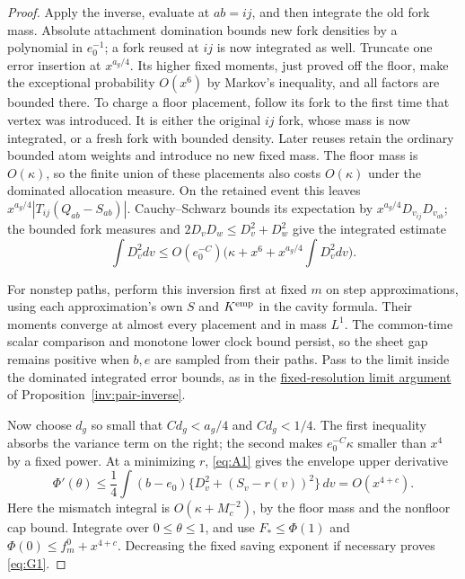 \begin{proof}
Apply the inverse, evaluate at \(ab=ij\), and then integrate the
old fork mass. Absolute attachment domination bounds new fork
densities by a polynomial in \(e_0^{-1}\); a fork reused at \(ij\)
is now integrated as well. Truncate one error insertion at
\(x^{a_g/4}\). Its higher fixed moments, just proved off the floor,
make the exceptional probability \(O(x^6)\) by Markov's inequality,
and all factors are bounded there. To charge a floor placement,
follow its fork to the first time that vertex was introduced. It is
either the original \(ij\) fork, whose mass is now integrated, or a
fresh fork with bounded density. Later reuses retain the ordinary
bounded atom weights and introduce no new fixed mass. The floor mass
is \(O(\kappa)\), so the finite union of these placements also costs
\(O(\kappa)\) under the dominated allocation measure.
On the retained event this leaves \(x^{a_g/4}|T_{ij}(Q_{ab}-S_{ab})|\).
Cauchy--Schwarz bounds its expectation by
\(x^{a_g/4}D_{v_{ij}}D_{v_{ab}}\); the bounded fork measures and
\(2D_vD_w\le D_v^2+D_w^2\) give the integrated estimate
\[
 \int D_v^2dv\le O(e_0^{-C})\big(\kappa+x^6+x^{a_g/4}\int D_v^2dv\big).
\]

For nonstep paths, perform this inversion first at fixed \(m\) on
step approximations, using each approximation's own \(S\) and
\(K^{\rm emp}\) in the cavity formula. Their moments converge at
almost every placement and in mass \(L^1\). The common-time scalar
comparison and monotone lower clock bound persist, so the sheet gap
remains positive when \(b,e\) are sampled from their paths.
Pass to the limit inside the dominated integrated error bounds, as
in the \hyperref[par:inverse-limits]{fixed-resolution limit argument}
of Proposition~\ref{inv:pair-inverse}.

Now choose \(d_g\) so small that \(Cd_g<a_g/4\) and
\(Cd_g<1/4\). The first inequality absorbs the variance term on
the right; the second makes \(e_0^{-C}\kappa\) smaller than
\(x^4\) by a fixed power. At a minimizing \(r\), \eqref{eq:A1}
gives the envelope upper derivative
\[
 \Phi'(\theta)\le\frac14\int(b-e_0)
                  \{D_v^2+(S_v-r(v))^2\}\,dv
                  =O(x^{4+c}).
\]
Here the mismatch integral is \(O(\kappa+M_c^{-2})\), by the
floor mass and the nonfloor cap bound. Integrate over
\(0\le\theta\le1\), and use
\(F_*\le\Phi(1)\) and \(\Phi(0)\le f_m^0+x^{4+c}\).
Decreasing the fixed saving exponent if necessary proves \eqref{eq:G1}.

\end{proof}
